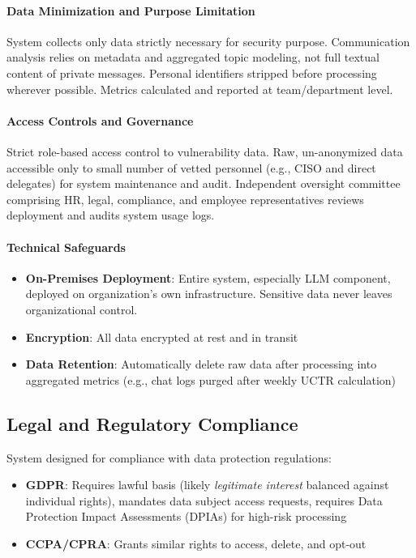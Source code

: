 \documentclass[11pt, a4paper]{article}
\begin{document}
\paragraph{Data Minimization and Purpose Limitation}
System collects only data strictly necessary for security purpose. Communication analysis relies on metadata and aggregated topic modeling, not full textual content of private messages. Personal identifiers stripped before processing wherever possible. Metrics calculated and reported at team/department level.

\paragraph{Access Controls and Governance}
Strict role-based access control to vulnerability data. Raw, un-anonymized data accessible only to small number of vetted personnel (e.g., CISO and direct delegates) for system maintenance and audit. Independent oversight committee comprising HR, legal, compliance, and employee representatives reviews deployment and audits system usage logs.

\paragraph{Technical Safeguards}
\begin{itemize}
\item \textbf{On-Premises Deployment}: Entire system, especially LLM component, deployed on organization's own infrastructure. Sensitive data never leaves organizational control.
\item \textbf{Encryption}: All data encrypted at rest and in transit
\item \textbf{Data Retention}: Automatically delete raw data after processing into aggregated metrics (e.g., chat logs purged after weekly UCTR calculation)
\end{itemize}

\subsection{Legal and Regulatory Compliance}

System designed for compliance with data protection regulations:
\begin{itemize}
\item \textbf{GDPR}: Requires lawful basis (likely \textit{legitimate interest} balanced against individual rights), mandates data subject access requests, requires Data Protection Impact Assessments (DPIAs) for high-risk processing
\item \textbf{CCPA/CPRA}: Grants similar rights to access, delete, and opt-out
\end{itemize}
\end{document}
